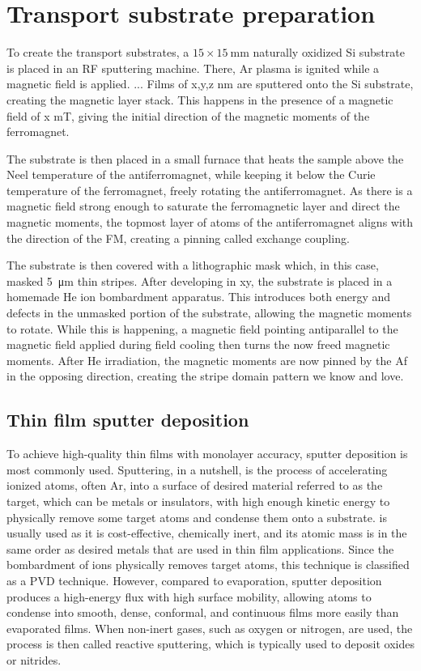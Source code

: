 \section{Transport substrate preparation}
To create the transport substrates, a $15\times\SI{15}{\milli\m}$ naturally oxidized Si substrate is placed in an \ac{RF} sputtering machine. 
There, Ar plasma is ignited while a magnetic field is applied.
...
Films of x,y,z nm are sputtered onto the Si substrate, creating the magnetic layer stack.
This happens in the presence of a magnetic field of x mT, giving the initial direction of the magnetic moments of the ferromagnet.

The substrate is then placed in a small furnace that heats the sample above the Neel temperature of the antiferromagnet, while keeping it below the Curie temperature of the ferromagnet, freely rotating the antiferromagnet.
As there is a magnetic field strong enough to saturate the ferromagnetic layer and direct the magnetic moments, the topmost layer of atoms of the antiferromagnet aligns with the direction of the FM, creating a pinning called exchange coupling.

The substrate is then covered with a lithographic mask which, in this case, masked \SI{5}{\micro\meter} thin stripes.
After developing in xy, the substrate is placed in a homemade He ion bombardment apparatus. 
This introduces both energy and defects in the unmasked portion of the substrate, allowing the magnetic moments to rotate.
While this is happening, a magnetic field pointing antiparallel to the magnetic field applied during field cooling then turns the now freed magnetic moments. 
After He irradiation, the magnetic moments are now pinned by the Af in the opposing direction, creating the stripe domain pattern we know and love. 


\subsection{Thin film sputter deposition}
To achieve high-quality thin films with monolayer accuracy, sputter deposition is most commonly used\cite{Seshan2012}.    
Sputtering, in a nutshell, is the process of accelerating ionized atoms, often \ac{Ar}, into a surface of desired material referred to as the target, which can be metals or insulators, with high enough kinetic energy to physically remove some target atoms and condense them onto a substrate.
 is usually used as it is cost-effective, chemically inert, and its atomic mass is in the same order as desired metals that are used in thin film applications\cite{Seshan2012}.  
Since the bombardment of ions physically removes target atoms, this technique is classified as a \ac{PVD} technique\cite{Seshan2012}. 
However, compared to evaporation, sputter deposition produces a high-energy flux with high surface mobility, allowing atoms to condense into smooth, dense, conformal, and continuous films more easily than evaporated films\cite{Seshan2012}.
When non-inert gases, such as oxygen or nitrogen, are used, the process is then called reactive sputtering, which is typically used to deposit oxides or nitrides\cite{Seshan2012}.

